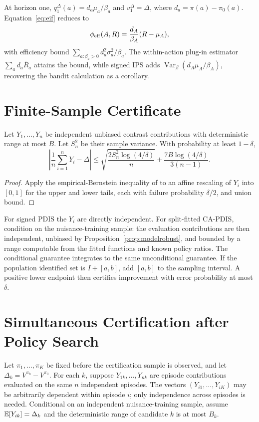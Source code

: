 At horizon one, $q_1^\Delta(a)=d_a\mu_a/\beta_a$ and $v_1^\Delta=\Delta$, where $d_a=\pi(a)-\pi_0(a)$. Equation~\eqref{eq:eif} reduces to
\[
\phi_{\rm eff}(A,R)=\frac{d_A}{\beta_A}(R-\mu_A),
\]
with efficiency bound
$\sum_{a:\beta_a>0}d_a^2\sigma_a^2/\beta_a$.
The within-action plug-in estimator $\sum_a d_a\overline R_a$ attains the bound, while signed IPS adds
$\operatorname{Var}_\beta(d_A\mu_A/\beta_A)$, recovering the bandit calculation as a corollary.

\section{Finite-Sample Certificate}

\begin{proposition}
Let $Y_1,\ldots,Y_n$ be independent unbiased contrast contributions with deterministic range at most $B$. Let $S_n^2$ be their sample variance. With probability at least $1-\delta$,
\[
\left|\frac1n\sum_{i=1}^nY_i-\Delta\right|
\le
\sqrt{\frac{2S_n^2\log(4/\delta)}{n}}
+\frac{7B\log(4/\delta)}{3(n-1)}.
\]
\end{proposition}
\begin{proof}
Apply the empirical-Bernstein inequality of \citet{maurer2009empirical} to an affine rescaling of $Y_i$ into $[0,1]$ for the upper and lower tails, each with failure probability $\delta/2$, and union bound.
\end{proof}

For signed PDIS the $Y_i$ are directly independent. For split-fitted CA-PDIS, condition on the nuisance-training sample: the evaluation contributions are then independent, unbiased by Proposition~\ref{prop:modelrobust}, and bounded by a range computable from the fitted functions and known policy ratios. The conditional guarantee integrates to the same unconditional guarantee. If the population identified set is $I+[a,b]$, add $[a,b]$ to the sampling interval. A positive lower endpoint then certifies improvement with error probability at most $\delta$.

\section{Simultaneous Certification after Policy Search}

Let $\pi_1,\ldots,\pi_K$ be fixed before the certification sample is observed, and let $\Delta_k=V^{\pi_k}-V^{\pi_0}$. For each $k$, suppose $Y_{1k},\ldots,Y_{nk}$ are episode contributions evaluated on the same $n$ independent episodes. The vectors $(Y_{i1},\ldots,Y_{iK})$ may be arbitrarily dependent within episode $i$; only independence across episodes is needed. Conditional on an independent nuisance-training sample, assume $\mathbb{E}[Y_{ik}]=\Delta_k$ and the deterministic range of candidate $k$ is at most $B_k$.

